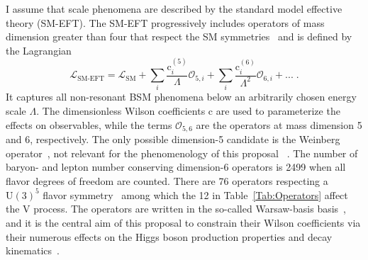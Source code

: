 \documentclass[a4paper,11pt]{article}
\renewcommand{\PV}{{{{V}}}\xspace}
\newcommand{\VH}{{{\PV}{\PH}}\xspace}
\begin{document}
I assume that \TeV scale phenomena are described by the standard model effective theory (SM-EFT). 
The SM-EFT progressively includes operators of mass dimension greater than four that respect the SM symmetries~\cite{Jenkins:2013zja,Alonso:2013hga,Jenkins:2013wua,Englert:2014cva,Brivio:2017vri} and is defined by the Lagrangian
\begin{equation}
\mathcal{L}_{\text{SM-EFT}} = \mathcal{L}_{\text{SM}} +  {\sum}_{i} \frac{\text{c}_i^{\left(5\right)}}{\Lambda} \mathcal{O}_{5,i} + {\sum}_{i} \frac{\text{c}_i^{\left(6\right)}}{{\Lambda}^{2}} \mathcal{O}_{6,i} + ... \;.
\label{Eq:SMEFT}
\end{equation}
It captures all non-resonant BSM phenomena below an arbitrarily chosen energy scale $\Lambda$.
The dimensionless Wilson coefficients $\text{c}$ are used to parameterize the effects on observables, while the terms $\mathcal{O}_{5, 6}$ are  the operators at mass dimension 5 and 6, respectively.
The only possible dimension-5 candidate is the  Weinberg operator~\cite{PhysRevLett.43.1566}, not relevant for the phenomenology of this proposal ~\cite{Bonnet:2009ej}.
The number of baryon- and lepton number conserving dimension-6 operators is 2499 when all flavor degrees of freedom are counted. There are 76 operators respecting a $\textrm{U}(3)^5$ flavor symmetry~\cite{Alonso:2013hga} among which the 12 in Table~\ref{Tab:Operators} affect the \VH process.
The operators are written in the so-called Warsaw-basis basis~\cite{Grzadkowski:2010es}, and it is the central aim of this proposal to constrain their Wilson coefficients via their numerous effects on the Higgs boson production properties and decay kinematics~\cite{Hagiwara:1993qt,Ellis:2014dva,Murphy:2017omb,Baglio:2020oqu}.
\end{document}
